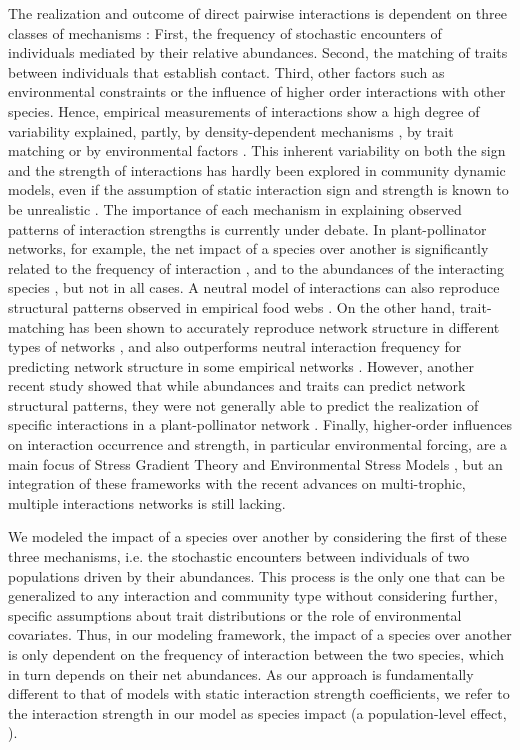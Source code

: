 The realization and outcome of direct pairwise interactions is dependent on three classes of mechanisms \citep{Poisot2015}: First, the frequency of stochastic encounters of individuals mediated by their relative abundances. Second, the matching of traits between individuals that establish contact. Third, other factors such as environmental constraints or the influence of higher order interactions with other species. Hence, empirical measurements of interactions show a high degree of variability explained, partly, by density-dependent mechanisms \citep{Aizen2014}, by trait matching \citep{Santamaria2007} or by environmental factors \citep{Mazia2016,Poisot2017}. This inherent variability on both the sign and the strength of interactions has hardly been explored in community dynamic models, even if the assumption of static interaction sign and strength is known to be unrealistic \citep{Abrams1980,Abrams2001,Hernandez1998,Holland2009}. The importance of each mechanism in explaining observed patterns of interaction strengths is currently under debate. In plant-pollinator networks, for example, the net impact of a species over another is significantly related to the frequency of interaction \citep{Vazquez2005,Vazquez2012}, and to the abundances of the interacting species \citep{Vazquez2007}, but not in all cases. A neutral model of interactions can also reproduce structural patterns observed in empirical food webs \citep{Canard2012}. On the other hand, trait-matching has been shown to accurately reproduce network structure in different types of networks \citep{Eklof2013}, and also outperforms neutral interaction frequency for predicting network structure in some empirical networks \citep{Vizentin-Bugoni2014,Sazatornil2016}. However, another recent study showed that while abundances and traits can predict network structural patterns, they were not generally able to predict the realization of specific interactions in a plant-pollinator network \citep{Olito2014}. Finally, higher-order influences on interaction occurrence and strength, in particular environmental forcing, are a main focus of Stress Gradient Theory \citep{Maestre2009} and Environmental Stress Models \citep{Menge1987}, but an integration of these frameworks with the recent advances on multi-trophic, multiple interactions networks is still lacking.

We modeled the impact of a species over another by considering the first of these three mechanisms, i.e. the stochastic encounters between individuals of two populations driven by their abundances. This process is the only one that can be generalized to any interaction and community type without considering further, specific assumptions about trait distributions or the role of environmental covariates. Thus, in our modeling framework, the impact of a species over another is only dependent on the frequency of interaction between the two species, which in turn depends on their net abundances. As our approach is fundamentally different to that of models with static interaction strength coefficients, we refer to the interaction strength in our model as species impact (a population-level effect, \citealt{Vazquez2012}).

